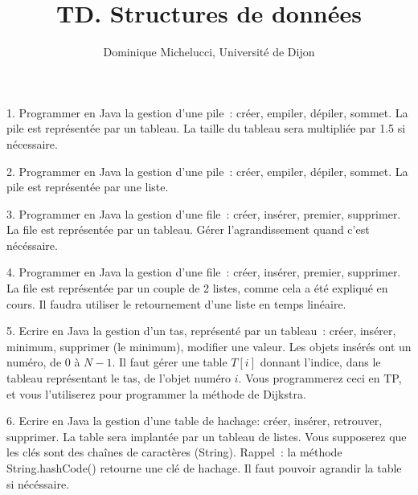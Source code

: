 \documentclass[a4paper]{article}
\begin{document}
\title{TD. Structures de donn\'ees}
\author{Dominique Michelucci, Universit\'e de Dijon}
\maketitle

1. Programmer en Java la gestion d'une pile~: cr\'eer, empiler, d\'epiler, sommet. La pile est repr\'esent\'ee par un tableau. La taille du tableau sera multipli\'ee par 1.5 si n\'ecessaire.

2. Programmer en Java la gestion d'une pile~: cr\'eer, empiler, d\'epiler, sommet. La pile est repr\'esent\'ee par une liste.

3. Programmer en Java la gestion d'une file~: cr\'eer, ins\'erer, premier, supprimer. La file
est repr\'esent\'ee par un tableau. G\'erer l'agrandissement  quand c'est n\'ec\'essaire.

4. Programmer en Java la gestion d'une file~: cr\'eer, ins\'erer, premier, supprimer. La file
est repr\'esent\'ee par un couple de 2 listes, comme cela a \'et\'e expliqu\'e en cours.
Il faudra utiliser le retournement d'une liste en temps lin\'eaire.

5. Ecrire en Java la gestion d'un tas, repr\'esent\'e par un tableau~: cr\'eer, ins\'erer, minimum, supprimer (le minimum), modifier une valeur.
Les objets ins\'er\'es ont un num\'ero, de 0 \`a  $N-1$.
Il faut g\'erer une table $T[i]$ donnant l'indice, dans le tableau repr\'esentant le tas, de l'objet num\'ero $i$.
Vous programmerez ceci en TP, et vous l'utiliserez pour programmer la m\'ethode de Dijkstra. 

6. Ecrire en Java la gestion d'une table de hachage: cr\'eer, ins\'erer, retrouver, supprimer. La table sera  implant\'ee par un tableau de listes.
Vous supposerez que les cl\'es sont des cha\^ines de caract\`eres (String).
Rappel~: la m\'ethode String.hashCode() retourne une cl\'e de hachage.
Il faut pouvoir agrandir la table si n\'ec\'essaire.
\end{document}
